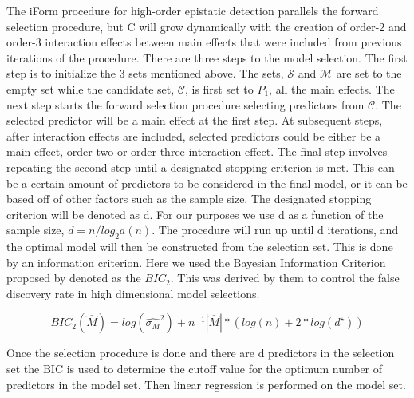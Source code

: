 \documentclass[11pt,]{book}
\theoremstyle{definition}
\theoremstyle{definition}
\theoremstyle{remark}
\begin{document}
The iForm procedure for high-order epistatic detection parallels the
forward selection procedure, but C will grow dynamically with the
creation of order-2 and order-3 interaction effects between main effects
that were included from previous iterations of the procedure. There are
three steps to the model selection. The first step is to initialize the
3 sets mentioned above. The sets, \(\mathcal{S}\) and \(\mathcal{M}\)
are set to the empty set while the candidate set, \(\mathcal{C}\), is
first set to \(P_1\), all the main effects. The next step starts the
forward selection procedure selecting predictors from \(\mathcal{C}\).
The selected predictor will be a main effect at the first step. At
subsequent steps, after interaction effects are included, selected
predictors could be either be a main effect, order-two or order-three
interaction effect. The final step involves repeating the second step
until a designated stopping criterion is met. This can be a certain
amount of predictors to be considered in the final model, or it can be
based off of other factors such as the sample size. The designated
stopping criterion will be denoted as d. For our purposes we use d as a
function of the sample size, \(d = n/log_2a(n)\). The procedure will run
up until d iterations, and the optimal model will then be constructed
from the selection set. This is done by an information criterion. Here
we used the Bayesian Information Criterion proposed by
\cite{chen2008extended} denoted as the \(BIC_2\). This was derived by
them to control the false discovery rate in high dimensional model
selections.

\begin{equation}
BIC_2(\hat{M}) = log(\hat{\sigma_M}^2) + n^{-1} |\hat{M}|*(log(n)+2*log(d^{\star}))
\label{eq:bic2}
\end{equation}

Once the selection procedure is done and there are d predictors in the
selection set the BIC is used to determine the cutoff value for the
optimum number of predictors in the model set. Then linear regression is
performed on the model set.
\end{document}
